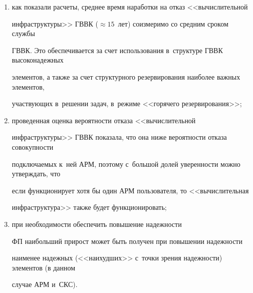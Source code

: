       \begin{enumerate}[(1)]

      \item  как показали расчеты, среднее время наработки на отказ <<вычислительной 

инфраструктуры>> ГВВК ($\approx15$~лет) соизмеримо со средним сроком службы 

ГВВК. Это обеспечивается за счет использования в~структуре ГВВК высоконадежных 

элементов, а также за счет структурного резервирования наиболее важных элементов, 

участвующих в~решении задач, в~режиме <<горячего резервирования>>; 

      \item проведенная оценка вероятности отказа <<вычислительной 

инфраструктуры>> ГВВК показала, что она ниже вероятности отказа совокупности 

под\-клю\-ча\-емых к~ней АРМ, поэтому с~большой долей уверенности можно утверждать, что 

если функционирует хотя бы один АРМ пользователя, то <<вычислительная 

инфраструктура>> также будет функционировать;

      \item при необходимости обеспечить повышение надежности 

ФП наибольший прирост может быть получен при повышении надежности 

наименее надежных (<<наихудших>> с~точки зрения надежности) элементов (в данном 

случае АРМ и~СКС).

      \end{enumerate}

      

